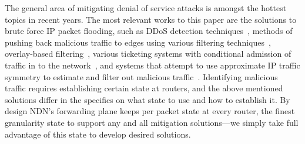 The general area of mitigating denial of service attacks is amongst the hottest topics in recent years.
The most relevant works to this paper are the solutions to brute force IP packet flooding, such as DDoS detection techniques~\cite{Chen:2007:Collaborative-detection, Jun:2011:DDoS-flooding}, methods of pushing back malicious traffic to edges using various filtering techniques~\cite{Pushback, Tupakula:2003:A-practical-method, Argyraki:2005:Active-internet, Oikonomou:2006:A-framework-for-a-collaborative, Liu:2008:To-filter-or-to-authorize:, Chou:2009:Proactive-surge, Liu:2010:NetFence:-preventing}, 
overlay-based filtering~\cite{Stone:2000:CenterTrack:-An-IP-overlay, Keromytis:2004:SOS:-An-architecture, Kline:2011:Shield:-DoS-filtering}, 
various ticketing systems with conditional admission of traffic in to the network~\cite{Yaar:2004:SIFF:-A-stateless, Yang:2005:A-DoS-limiting-network, Wendlandt:2006:Fastpass:-Providing, Natu:2007:Fine-grained-capabilities, Portcullis, Capabilities},
and systems that attempt to use approximate IP traffic symmetry to estimate and filter out malicious traffic~\cite{Wang:2002:Detecting-SYN-flooding, Kreibich:2005:Using-packet, Mahimkar:2007:dFence:-Transparent}. 
Identifying malicious traffic requires establishing certain state at routers, and the above mentioned solutions differ in the specifics on what state to use and how to establish it.  By design NDN's forwarding plane keeps per packet state at every router, the finest granularity state to support any and all mitigation solutions---we simply take full advantage of this state to develop desired solutions.















